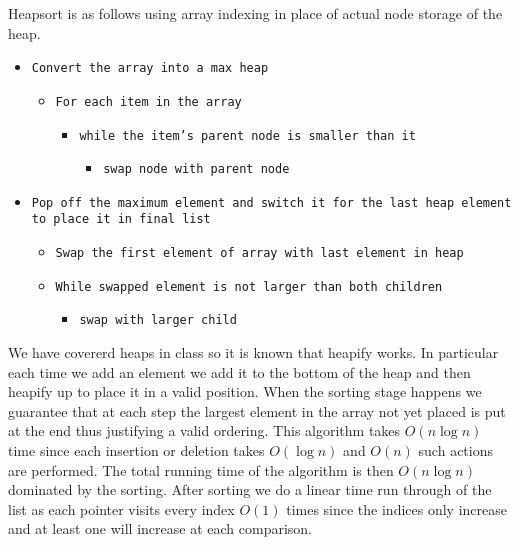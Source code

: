 \documentclass{amsart}
\begin{document}
Heapsort is as follows using array indexing in place of actual node storage of the heap.
{\small
    \begin{itemize}
        \item \texttt{Convert the array into a max heap}
            \begin{itemize}
                \item \texttt{For each item in the array}
                    \begin{itemize}
                        \item \texttt{while the item's parent node is smaller than it}
                            \begin{itemize}
                                \item \texttt{swap node with parent node}
                            \end{itemize}
                    \end{itemize}
            \end{itemize}
        \item \texttt{Pop off the maximum element and switch it for the last heap element to place it in final list}
            \begin{itemize}
                \item \texttt{Swap the first element of array with last element in heap}
                \item \texttt{While swapped element is not larger than both children}
                    \begin{itemize}
                        \item \texttt{swap with larger child}
                    \end{itemize}
            \end{itemize}
    \end{itemize}
}
We have covererd heaps in class so it is known that heapify works. In particular each time we add an element we add it to the bottom of the heap and then
heapify up to place it in a valid position. When the sorting stage happens we guarantee that at each step the largest element in the array not yet placed
is put at the end thus justifying a valid ordering. This algorithm takes $O(n\log n)$ time since each insertion or deletion takes $O(\log n)$ and $O(n)$ such
actions are performed.
The total running time of the algorithm is then $O(n \log n)$ dominated by the sorting. After sorting we do a linear time run through of the list as
each pointer visits every index $O(1)$ times since the indices only increase and at least one will increase at each comparison.
\end{document}
